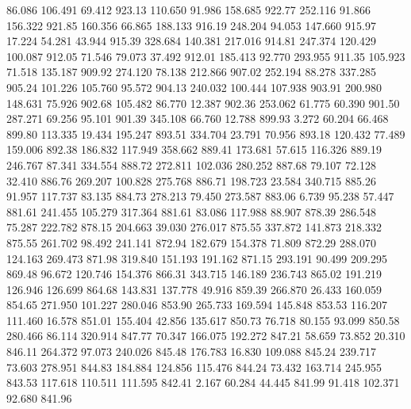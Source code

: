   86.086  106.491   69.412       923.13
 110.650   91.986  158.685       922.77
 252.116   91.866  156.322       921.85
 160.356   66.865  188.133       916.19
 248.204   94.053  147.660       915.97
  17.224   54.281   43.944       915.39
 328.684  140.381  217.016       914.81
 247.374  120.429  100.087       912.05
  71.546   79.073   37.492       912.01
 185.413   92.770  293.955       911.35
 105.923   71.518  135.187       909.92
 274.120   78.138  212.866       907.02
 252.194   88.278  337.285       905.24
 101.226  105.760   95.572       904.13
 240.032  100.444  107.938       903.91
 200.980  148.631   75.926       902.68
 105.482   86.770   12.387       902.36
 253.062   61.775   60.390       901.50
 287.271   69.256   95.101       901.39
 345.108   66.760   12.788       899.93
   3.272   60.204   66.468       899.80
 113.335   19.434  195.247       893.51
 334.704   23.791   70.956       893.18
 120.432   77.489  159.006       892.38
 186.832  117.949  358.662       889.41
 173.681   57.615  116.326       889.19
 246.767   87.341  334.554       888.72
 272.811  102.036  280.252       887.68
  79.107   72.128   32.410       886.76
 269.207  100.828  275.768       886.71
 198.723   23.584  340.715       885.26
  91.957  117.737   83.135       884.73
 278.213   79.450  273.587       883.06
   6.739   95.238   57.447       881.61
 241.455  105.279  317.364       881.61
  83.086  117.988   88.907       878.39
 286.548   75.287  222.782       878.15
 204.663   39.030  276.017       875.55
 337.872  141.873  218.332       875.55
 261.702   98.492  241.141       872.94
 182.679  154.378   71.809       872.29
 288.070  124.163  269.473       871.98
 319.840  151.193  191.162       871.15
 293.191   90.499  209.295       869.48
  96.672  120.746  154.376       866.31
 343.715  146.189  236.743       865.02
 191.219  126.946  126.699       864.68
 143.831  137.778   49.916       859.39
 266.870   26.433  160.059       854.65
 271.950  101.227  280.046       853.90
 265.733  169.594  145.848       853.53
 116.207  111.460   16.578       851.01
 155.404   42.856  135.617       850.73
  76.718   80.155   93.099       850.58
 280.466   86.114  320.914       847.77
  70.347  166.075  192.272       847.21
  58.659   73.852   20.310       846.11
 264.372   97.073  240.026       845.48
 176.783   16.830  109.088       845.24
 239.717   73.603  278.951       844.83
 184.884  124.856  115.476       844.24
  73.432  163.714  245.955       843.53
 117.618  110.511  111.595       842.41
   2.167   60.284   44.445       841.99
  91.418  102.371   92.680       841.96
